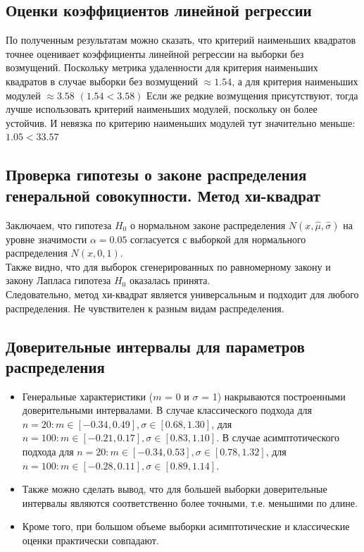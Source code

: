 \documentclass[a4paper]{article}
\begin{document}
\subsection{Оценки коэффициентов линейной регрессии}
\noindent По полученным результатам можно сказать, что критерий наименьших квадратов точнее оценивает коэффициенты линейной регрессии на выборки без возмущений. Поскольку метрика удаленности для критерия наименьших квадратов в случае выборки без возмущений $\approx 1.54$, а для критерия наименьших модулей $\approx 3.58$ $(1.54 < 3.58)$ Если же редкие возмущения присутствуют, тогда лучше использовать критерий наименьших модулей, поскольку он более устойчив. И невязка по критерию наименьших модулей тут значительно меньше: $1.05 < 33.57$
\subsection{Проверка гипотезы о законе распределения генеральной совокупности. Метод хи-квадрат}
	
\noindent Заключаем, что гипотеза $H_{0}$ о нормальном законе распределения $N(x,\hat{\mu}, \hat{\sigma})$ на уровне значимости $\alpha = 0.05$ согласуется с выборкой для нормального распределения $N(x, 0, 1)$. 
\\
Также видно, что для выборок сгенерированных по равномерному закону и закону Лапласа гипотеза $H_{0}$ оказалась принята.\\
Следовательно, метод хи-квадрат является универсальным и подходит для любого распределения. Не чувствителен к разным видам распределения. 
 \subsection{Доверительные интервалы для параметров распределения}
 \begin{itemize}
    \item Генеральные характеристики ($m$ = 0 и $\sigma$ = 1) накрываются построенными доверительными интервалами. В случае классического подхода для $n=20: m\in [-0.34,0.49], \sigma \in [0.68,1.30]$, для $n=100: m\in [-0.21,0.17], \sigma \in [0.83,1.10]$. В случае асимптотического подхода для $n=20: m\in [-0.34,0.53], \sigma \in [0.78,1.32]$, для $n=100: m\in [-0.28,0.11], \sigma \in [0.89,1.14]$.
    \item Также можно сделать вывод, что для большей выборки доверительные интервалы являются соответственно более точными, т.е. меньшими по длине. 
    \item Кроме того, при большом объеме выборки асимптотические и классические оценки практически совпадают.
\end{itemize}
\end{document}
